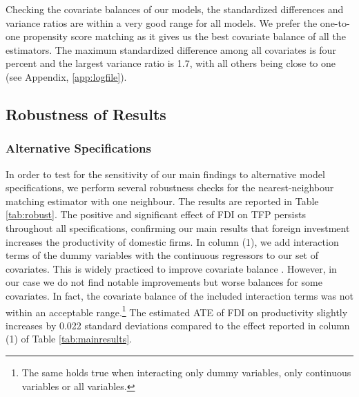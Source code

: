 \documentclass[a4paper,11pt]{scrartcl}
\begin{document}
Checking the covariate balances of our models, the standardized differences and variance ratios are within a very good range for all models. We prefer the one-to-one propensity score matching as it gives us the best covariate balance of all the estimators. The maximum standardized difference among all covariates is four percent and the largest variance ratio is 1.7, with all others being close to one (see Appendix, \ref{app:logfile}). 


\subsection{Robustness of Results}

\subsubsection*{Alternative Specifications} 
In order to test for the sensitivity of our main findings to alternative model specifications, we perform several robustness checks for the nearest-neighbour matching estimator with one neighbour. The results are reported in Table \ref{tab:robust}. The positive and significant effect of FDI on TFP persists throughout all specifications, confirming our main results that foreign investment increases the productivity of domestic firms. In column (1), we add interaction terms of the dummy variables with the continuous regressors to our set of covariates. This is widely practiced to improve covariate balance \citep{Caliendo08}. However, in our case we do not find notable improvements but worse balances for some covariates. In fact, the covariate balance of the included interaction terms was not within an acceptable range.\footnote{The same holds true when interacting only dummy variables, only continuous variables or all variables.} The estimated ATE of FDI on productivity slightly increases by 0.022 standard deviations compared to the effect reported in column (1) of Table \ref{tab:mainresults}. 
\newpage
\end{document}
